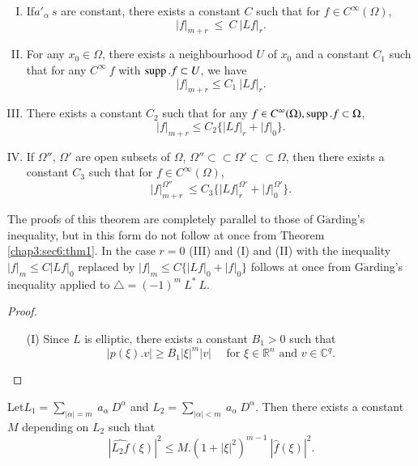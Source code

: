 \begin{enumerate}[(I)]
\item If\pageoriginale $a'_\alpha ~ s$ are constant, there exists a constant $C$
  such that for $f \in C^\infty (\Omega)$, 
  $$
  | f |_{m+r} ~ \leq ~ C ~ | Lf |_r.
  $$
\item For any $x_0 \in \Omega$, there exists a neighbourhood $U$ of
  $x_0$ and a constant $C_1$ such that for any $C^\infty ~ f$ with
  $\operatorname{supp}. f \subset U$, we have 
  $$
  | f |_{m+r} \leq C_1 ~ | Lf |_r.
  $$
\item There exists a constant $C_2$ such that for any $f \in C^\infty
  (\Omega ), \operatorname{supp}. f \subset \Omega $, 
  $$
  | f |_{m+r} \leq C_2 \{ | Lf |_r + | f |_0 \}.
  $$
\item If $\Omega''$, $\Omega'$ are open subsets of $\Omega$, $\Omega''
  \subset\subset \Omega' \subset\subset \Omega$, then there exists a
  constant $C_3$ such that for $f \in C^\infty (\Omega)$, 
  $$
  | f |^{\Omega''}_{m+r} ~ \leq C_3 \{ | Lf |^{\Omega'}_r + | f |^{\Omega'}_0 \}.
  $$
\end{enumerate}

The proofs of this theorem are completely parallel to those of
G$\ring{\text{a}}$rd\-ing's inequality, but in this form do
not follow at once from Theorem \ref{chap3:sec6:thm1}.
  In the case $r = 0$ (III) and (I) and (II) with the inequality $| f
  |_m \leq C | Lf |_0 $ replaced by $| f |_m \leq C \{  | Lf |_0 + | f
  |_0\}$ follows at once from G$\ring{\text{a}}$rding's inequality applied to
  $\triangle = (-1)^m ~ L^* ~ L$. 

\begin{proof}%
  \begin{enumerate}
  \item[(I)] Since $L$ is elliptic, there exists a constant $B_1 > 0$
    such that  
    \begin{equation}
      | p(\xi ) . v | \geq B_1 | \xi |^m | v | \quad \text{ for }  \xi
      \in \mathbb{R}^n \text{ and } v \in
      \mathbb{C}^q. \tag{6.2}\label{chap3:sec6:eq6.2}  
    \end{equation}
  \end{enumerate}
\end{proof}

Let\pageoriginale $L_1 = \sum\limits_{| \alpha | = m} ~ a_\alpha ~ D^\alpha$ and
$L_2 = \sum\limits_{| \alpha | < m} ~ a_\alpha ~ D^\alpha$. Then there
exists a constant $M$ depending on $L_2$ such that  
\begin{equation}
  |\widehat{L_2 f} (\xi ) |^2 \leq M. (1 + | \xi |^2)^{m-1} ~
  |\hat{f}(\xi) |^2. \tag{6.3}\label{chap3:sec6:eq6.3} 
\end{equation}

